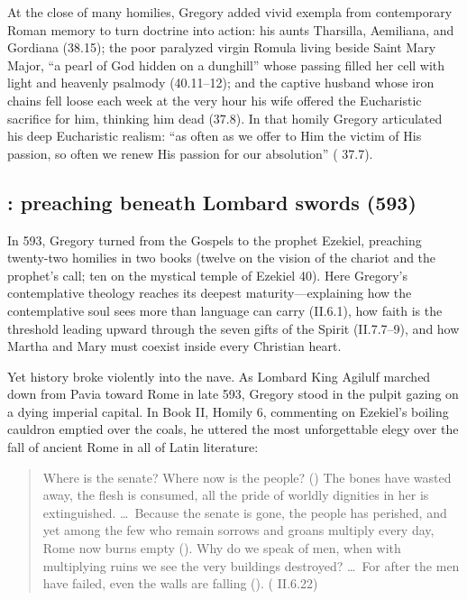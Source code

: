 At the close of many homilies, Gregory added vivid exempla from contemporary
Roman memory to turn doctrine into action: his aunts Tharsilla, Aemiliana, and
Gordiana (38.15); the poor paralyzed virgin Romula living beside Saint Mary
Major, ``a pearl of God hidden on a dunghill'' whose passing filled her cell
with light and heavenly psalmody (40.11--12); and the captive husband whose
iron chains fell loose each week at the very hour his wife offered the
Eucharistic sacrifice for him, thinking him dead (37.8). In that homily Gregory
articulated his deep Eucharistic realism: ``as often as we offer to Him the
victim of His passion, so often we renew His passion for our absolution''
( 37.7).

\subsection{: preaching beneath Lombard swords (593)}

In 593, Gregory turned from the Gospels to the prophet Ezekiel, preaching
twenty-two homilies in two books (twelve on the vision of the chariot and the
prophet's call; ten on the mystical temple of Ezekiel 40). Here Gregory's
contemplative theology reaches its deepest maturity---explaining how the
contemplative soul sees more than language can carry (II.6.1), how faith is
the threshold leading upward through the seven gifts of the Spirit (II.7.7--9),
and how Martha and Mary must coexist inside every Christian heart.

Yet history broke violently into the nave. As Lombard King Agilulf marched
down from Pavia toward Rome in late 593, Gregory stood in the pulpit gazing on
a dying imperial capital. In Book II, Homily 6, commenting on Ezekiel's
boiling cauldron emptied over the coals, he uttered the most unforgettable
elegy over the fall of ancient Rome in all of Latin literature:

\begin{quote}
Where is the senate? Where now is the people? () The bones have wasted away, the flesh is consumed, all the pride
of worldly dignities in her is extinguished. \dots\ Because the senate is gone,
the people has perished, and yet among the few who remain sorrows and groans
multiply every day, Rome now burns empty (). Why do
we speak of men, when with multiplying ruins we see the very buildings
destroyed? \dots\ For after the men have failed, even the walls are falling
(). ( II.6.22)
\end{quote}

